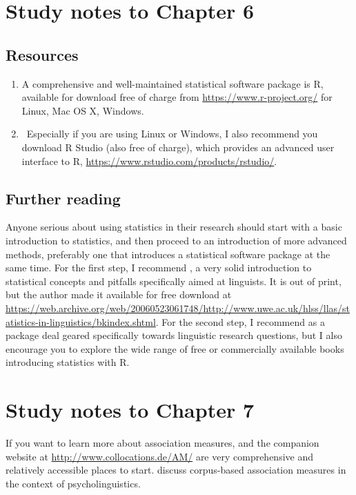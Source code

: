 \section{Study notes to Chapter 6}
\label{sec:studynotes06}

\subsection*{Resources}

\begin{enumerate}
  \item A comprehensive and well-maintained statistical software package is R, available for download free of charge from \url{https://www.r-project.org/} for Linux, Mac OS X, Windows.
  \item Especially if you are using Linux or Windows, I also recommend you download R Studio (also free of charge), which provides an advanced user interface to R, \url{https://www.rstudio.com/products/rstudio/}.
\end{enumerate}


\subsection*{Further reading}

Anyone serious about using statistics in their research should start with a basic introduction to statistics, and then proceed to an introduction of more advanced methods, preferably one that introduces a statistical software package at the same time. For the first step, I recommend \citet{butler_statistics_1985}, a very solid introduction to statistical concepts and pitfalls specifically aimed at linguists. It is out of print, but the author made it available for free download at \url{https://web.archive.org/web/20060523061748/http://www.uwe.ac.uk/hlss/llas/statistics-in-linguistics/bkindex.shtml}. For the second step, I recommend \citet{gries_statistics_2013} as a package deal geared specifically towards linguistic research questions, but I also encourage you to explore the wide range of free or commercially available books introducing statistics with R.


\section{Study notes to Chapter 7}
\label{sec:studynotes07}

If you want to learn more about association measures, \citet{evert_statistics_2005} and the companion website at \url{http://www.collocations.de/AM/} are very comprehensive and relatively accessible places to start. \citet{stefanowitsch_corpus-based_2016} discuss corpus-based association measures in the context of psycholinguistics.


